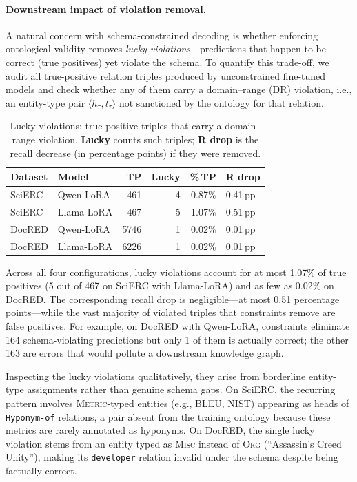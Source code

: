 \paragraph{Downstream impact of violation removal.}
\label{app:downstream-impact}

A natural concern with schema-constrained decoding is whether enforcing ontological validity removes \emph{lucky violations}---predictions that happen to be correct (true positives) yet violate the schema.
To quantify this trade-off, we audit all true-positive relation triples produced by unconstrained fine-tuned models and check whether any of them carry a domain--range (DR) violation, i.e., an entity-type pair \mbox{$\langle h_\tau, t_\tau \rangle$} not sanctioned by the ontology for that relation.

\begin{table}[h]
\centering
\small
\begin{tabular}{llrrrl}
\toprule
\textbf{Dataset} & \textbf{Model} & \textbf{TP} & \textbf{Lucky} & \textbf{\%\,TP} & \textbf{R drop} \\
\midrule
SciERC & Qwen-LoRA  & 461  & 4 & 0.87\% & 0.41\,pp \\
SciERC & Llama-LoRA & 467  & 5 & 1.07\% & 0.51\,pp \\
DocRED & Qwen-LoRA  & 5746 & 1 & 0.02\% & 0.01\,pp \\
DocRED & Llama-LoRA & 6226 & 1 & 0.02\% & 0.01\,pp \\
\bottomrule
\end{tabular}
\caption{Lucky violations: true-positive triples that carry a domain--range violation. \textbf{Lucky} counts such triples; \textbf{R drop} is the recall decrease (in percentage points) if they were removed.}
\label{tab:lucky-violations-detail}
\end{table}

Across all four configurations, lucky violations account for at most 1.07\% of true positives (5 out of 467 on SciERC with Llama-LoRA) and as few as 0.02\% on DocRED.
The corresponding recall drop is negligible---at most 0.51 percentage points---while the vast majority of violated triples that constraints remove are false positives.
For example, on DocRED with Qwen-LoRA, constraints eliminate 164 schema-violating predictions but only 1 of them is actually correct; the other 163 are errors that would pollute a downstream knowledge graph.

Inspecting the lucky violations qualitatively, they arise from borderline entity-type assignments rather than genuine schema gaps.
On SciERC, the recurring pattern involves \textsc{Metric}-typed entities (e.g., BLEU, NIST) appearing as heads of \texttt{Hyponym-of} relations, a pair absent from the training ontology because these metrics are rarely annotated as hyponyms.
On DocRED, the single lucky violation stems from an entity typed as \textsc{Misc} instead of \textsc{Org} (``Assassin's Creed Unity''), making its \texttt{developer} relation invalid under the schema despite being factually correct.

